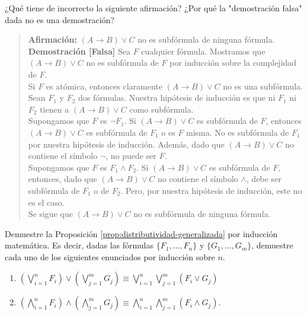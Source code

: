 \documentclass[12pt,a4paper]{book}
\newcommand{\comillas}[1]{"#1"}
\begin{document}
    \begin{ejercicio}
        ¿Qué tiene de incorrecto la siguiente afirmación? ¿Por qué la \comillas{demostración falsa} dada no es una
        demostración?
        \begin{quote}
            \textbf{Afirmación:} $(A\rightarrow B)\vee C$ no es subfórmula de ninguna fórmula.\\[0.2cm]
            \textbf{Demostración [Falsa]} Sea $F$ cualquier fórmula. Mostramos que $(A\rightarrow B)\vee C$ no es
            subfórmula de $F$ por inducción sobre la complejidad de $F$.\\
            Si $F$ es atómica, entonces claramente $(A\rightarrow B)\vee C$ no es una subfórmula.\\
            Sean $F_{1}$ y $F_{2}$ dos fórmulas. Nuestra hipótesis de inducción es que ni $F_{1}$ ni $F_{2}$ tienen a
            $(A\rightarrow B)\vee C$ como subfórmula.\\
            Supongamos que $F$ es $\neg F_{1}$. Si $(A\rightarrow B)\vee C$ es subfórmula de $F$, entonces
            $(A\rightarrow B)\vee C$ es subfórmula de $F_{1}$ o es $F$ misma. No es subfórmula de $F_{1}$ por nuestra
            hipótesis de inducción. Además, dado que $(A\rightarrow B)\vee C$ no contiene el símbolo $\neg$, no puede ser
            $F$.\\
            Supongamos que $F$ es $F_{1}\wedge F_{2}$. Si $(A\rightarrow B)\vee C$ es subfórmula de $F$, entonces, dado que
            $(A\rightarrow B)\vee C$ no contiene el símbolo $\wedge$, debe ser subfórmula de $F_{1}$ o de $F_{2}$. Pero, por
            nuestra hipótesis de inducción, este no es el caso.\\
            Se sigue que $(A\rightarrow B)\vee C$ no es subfórmula de ninguna fórmula.
        \end{quote}
    \end{ejercicio}

    \begin{ejercicio}\label{ej:prop-distributividad-generalizada}
        Demuestre la Proposición \ref{prop:distributividad-generalizada} por inducción matemática. Es decir, dadas las
        fórmulas $\{F_{1},\dots,F_{n}\}$ y $\{G_{1},\dots,G_{m}\}$, demuestre cada uno de los siguientes enunciados por
        inducción sobre $n$.
        \begin{enumerate}[label=(\alph*)]
            \item $\left(\bigvee_{i=1}^{n}F_{i}\right)\vee\left(\bigvee_{j=1}^{m}G_{j}\right)\equiv
            \bigvee_{i=1}^{n}\bigvee_{j=1}^{m}(F_{i}\vee G_{j})$
            \item $\left(\bigwedge_{i=1}^{n}F_{i}\right)\wedge\left(\bigwedge_{j=1}^{m}G_{j}\right)\equiv
            \bigwedge_{i=1}^{n}\bigwedge_{j=1}^{m}(F_{i}\wedge G_{j})$.
        \end{enumerate}
    \end{ejercicio}
\end{document}
